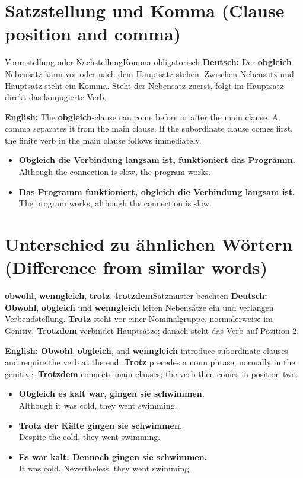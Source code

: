 \documentclass[a4paper,11pt]{article}
\newcommand{\GermanText}[1]{\textbf{Deutsch: }#1\par}\newcommand{\EnglishText}[1]{{\small\color{SoftGray}\textbf{English: }#1\par}}\newcommand{\ExampleItem}[2]{\item \textbf{#1}\\{\small\color{SoftGray}#2}}
\begin{document}
\section{Satzstellung und Komma \textnormal{(Clause position and comma)}}
\begin{grammarentry}{Voranstellung oder Nachstellung}{Komma obligatorisch}
\GermanText{Der \textbf{obgleich}-Nebensatz kann vor oder nach dem Hauptsatz stehen. Zwischen Nebensatz und Hauptsatz steht ein Komma. Steht der Nebensatz zuerst, folgt im Hauptsatz direkt das konjugierte Verb.}
\EnglishText{The \textbf{obgleich}-clause can come before or after the main clause. A comma separates it from the main clause. If the subordinate clause comes first, the finite verb in the main clause follows immediately.}
\end{grammarentry}
\begin{exbox}\begin{itemize}
\ExampleItem{Obgleich die Verbindung langsam ist, funktioniert das Programm.}{Although the connection is slow, the program works.}
\ExampleItem{Das Programm funktioniert, obgleich die Verbindung langsam ist.}{The program works, although the connection is slow.}
\end{itemize}\end{exbox}

\section{Unterschied zu ähnlichen Wörtern \textnormal{(Difference from similar words)}}
\begin{grammarentry}{\textbf{obwohl}, \textbf{wenngleich}, \textbf{trotz}, \textbf{trotzdem}}{Satzmuster beachten}
\GermanText{\textbf{Obwohl}, \textbf{obgleich} und \textbf{wenngleich} leiten Nebensätze ein und verlangen Verbendstellung. \textbf{Trotz} steht vor einer Nominalgruppe, normalerweise im Genitiv. \textbf{Trotzdem} verbindet Hauptsätze; danach steht das Verb auf Position 2.}
\EnglishText{\textbf{Obwohl}, \textbf{obgleich}, and \textbf{wenngleich} introduce subordinate clauses and require the verb at the end. \textbf{Trotz} precedes a noun phrase, normally in the genitive. \textbf{Trotzdem} connects main clauses; the verb then comes in position two.}
\end{grammarentry}
\begin{exbox}\begin{itemize}
\ExampleItem{Obgleich es kalt war, gingen sie schwimmen.}{Although it was cold, they went swimming.}
\ExampleItem{Trotz der Kälte gingen sie schwimmen.}{Despite the cold, they went swimming.}
\ExampleItem{Es war kalt. Dennoch gingen sie schwimmen.}{It was cold. Nevertheless, they went swimming.}
\end{itemize}\end{exbox}
\end{document}
